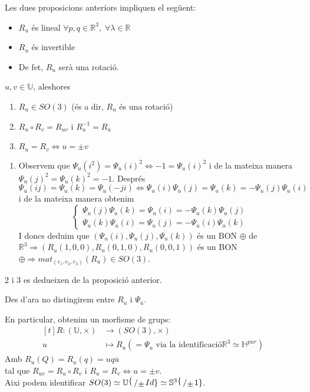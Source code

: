 \documentclass[../main.tex]{subfiles}
\begin{document}
	Les dues proposicions anteriors impliquen el següent:
	\begin{itemize}
		\item $R_u$ és lineal $\forall p,q \in \mathbb{R}^3,\;\forall\lambda\in\mathbb{R}$
		\item $R_u$ és invertible
		\item De fet, $R_u$ serà una rotació.
	\end{itemize}
	\begin{teorema}
		$u, v \in \mathbb{U}$, aleshores
		\begin{enumerate}
			\item $R_u \in SO(3)$ (és a dir, $R_u$ és una rotació)
			\item $R_u \circ R_v = R_{uv}$ i $R_u^{-1} = R_{\overline{u}}$
			\item $R_u = R_v \iff u = \pm v$
		\end{enumerate}
	\end{teorema}
	\begin{demostracio}
		\begin{enumerate}
			\item Observem que $\Psi_u(i^2) = \Psi_u(i)^2 \iff -1 = \Psi_u(i)^2$ i de la mateixa manera $\Psi_u(j)^2=\Psi_u(k)^2 = -1$.
			Després $\Psi_u(ij)=\Psi_u(k)=\Psi_u(-ji) \iff \Psi_u(i)\Psi_u(j) = \Psi_u(k) = -\Psi_u(j)\Psi_u(i)$ i de la mateixa manera obtenim
			\begin{displaymath}
				\begin{cases}
					\Psi_u(j)\Psi_u(k) = \Psi_u(i) = -\Psi_u(k)\Psi_u(j)\\
					\Psi_u(k)\Psi_u(i) = \Psi_u(j) = -\Psi_u(i)\Psi_u(k)
				\end{cases}
			\end{displaymath}
			I doncs deduim que $\left(\Psi_u(i), \Psi_u(j), \Psi_u(k)\right)$ és un BON $\oplus$ de $\mathbb{R}^3 \Rightarrow (R_u(1,0,0), R_u(0,1,0), R_u(0,0,1))$ és un BON $\oplus \Rightarrow mat_{(e_1, e_2, e_3)}(R_u) \in SO(3)$.
		\end{enumerate}
		2 i 3 es dedueixen de la proposició anterior.
	\end{demostracio}
	\begin{notacio}
		Des d'ara no distingirem entre $R_u$ i $\Psi_u$.
	\end{notacio}
	\begin{obs}
		En particular, obtenim un morfisme de grups:
		\begin{displaymath}
			\begin{aligned}[t]
				R: (\mathbb{U}, \times) &\to (SO(3), \times)\\
				u &\mapsto R_u (= \Psi_u \text{ via la identificació} \mathbb{R}^3 \simeq \mathbb{H}^{pur})
			\end{aligned}
		\end{displaymath}
		Amb $R_u(Q) = R_u(q) = uq\overline{u}$\\
		tal que $R_{uv} = R_u \circ R_v$ i $R_u = R_v \iff u = \pm v$.\\
		Aixi podem identificar $SO(3) \simeq \mathbb{U}\bigslant\{\pm Id\} \simeq \mathbb{S}^3\bigslant\{\pm 1\}$.
	\end{obs}
\end{document}
